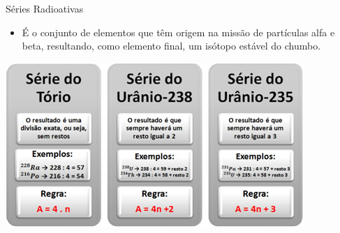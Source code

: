 \documentclass[presentation,professionalfonts,aspectratio=169]{beamer}
\begin{document}
\begin{frame}[label={sec:orged4658a}]{Séries Radioativas}
\begin{itemize}
\item É o conjunto de elementos que têm origem na missão de partículas alfa e beta, resultando, como elemento final, um isótopo estável do chumbo.
\end{itemize}
\begin{center}
\includegraphics[width=.9\linewidth]{FQ/Radioatividade/serieradioativas.jpg}
\end{center}
\end{frame}
\end{document}
